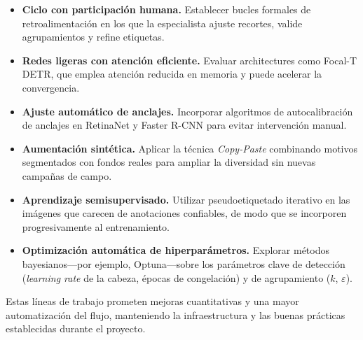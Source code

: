 \begin{itemize}
  \item \textbf{Ciclo con participación humana.}
        Establecer bucles formales de retroalimentación en los que la especialista ajuste recortes, valide agrupamientos y refine etiquetas.
  \item \textbf{Redes ligeras con atención eficiente.}
        Evaluar architectures como Focal-T DETR, que emplea atención reducida en memoria y puede acelerar la convergencia.
  \item \textbf{Ajuste automático de anclajes.}
        Incorporar algoritmos de autocalibración de anclajes en RetinaNet y Faster R-CNN para evitar intervención manual.
  \item \textbf{Aumentación sintética.}
        Aplicar la técnica \emph{Copy-Paste} combinando motivos segmentados con fondos reales para ampliar la diversidad sin nuevas campañas de campo.
  \item \textbf{Aprendizaje semisupervisado.}
        Utilizar pseudoetiquetado iterativo en las imágenes que carecen de anotaciones confiables, de modo que se incorporen progresivamente al entrenamiento.
  \item \textbf{Optimización automática de hiperparámetros.}
        Explorar métodos bayesianos—por ejemplo, Optuna—sobre los parámetros clave de detección (\emph{learning rate} de la cabeza, épocas de congelación) y de agrupamiento (\(k\), \(\varepsilon\)).
\end{itemize}

Estas líneas de trabajo prometen mejoras cuantitativas y una mayor automatización del flujo, manteniendo la infraestructura y las buenas prácticas establecidas durante el proyecto.
